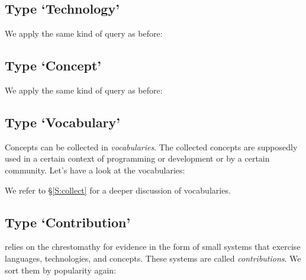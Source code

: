 \subsection{Type `Technology'}

We apply the same kind of query as before:




\subsection{Type `Concept'}

We apply the same kind of query as before:




\subsection{Type `Vocabulary'}
\label{S:vocabulary}

Concepts can be collected in \emph{vocabularies}. The collected
concepts are supposedly used in a certain context of programming or
development or by a certain community. Let's have a look at the
vocabularies:



\noindent
We refer to \S\ref{S:collect} for a deeper discussion of vocabularies.


\subsection{Type `Contribution'}

\solasote{} relies on the chrestomathy \ooo{} for evidence in the form
of small systems that exercise languages, technologies, and
concepts. These systems are called \emph{contributions}. We sort them
by popularity again:


